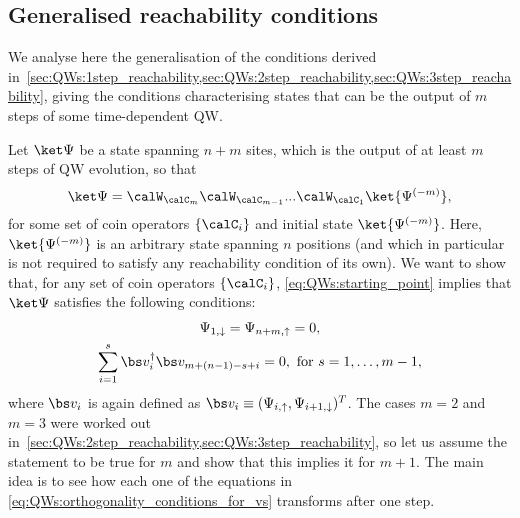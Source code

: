\subsection{Generalised reachability conditions}
\label{sec:QWs:general_reachability_conditions}

We analyse here the generalisation of the conditions derived in~\cref{sec:QWs:1step_reachability,sec:QWs:2step_reachability,sec:QWs:3step_reachability}, giving the conditions characterising states that can be the output of $m$ steps of some time-dependent QW.

Let $\ket\Psi$ be a state spanning $n+m$ sites, which is the output of at least $m$ steps of \ac{QW} evolution, so that
\begin{equation}
	\ket\Psi =
	\calW_{\calC_{m}} \calW_{\calC_{m-1}} ... \calW_{\calC_{1}}
    \ket{\Psi^{(-m)}},
	\label{eq:QWs:starting_point}
\end{equation}
for some set of coin operators $\{\calC_i \}$ and initial state $\ket{\Psi^{(-m)}}$.
Here, $\ket{\Psi^{(-m)}}$ is an arbitrary state spanning $n$ positions (and which in particular is not required to satisfy any reachability condition of its own).
We want to show that, for any set of coin operators $\{\calC_i \}$, \cref{eq:QWs:starting_point} implies that $\ket\Psi$ satisfies the following conditions:
\begin{gather}
	\Psi_{1,\downarrow} = \Psi_{n+m, \uparrow} = 0,
    \label{eq:QWs:vanishing_amplitudes}
	\\
    \sum_{i=1}^s \bs v_i^\dagger \bs v_{m+(n-1)-s+i} = 0,
	\text{ for } s=1,\ldots, m-1,
	\label{eq:QWs:orthogonality_conditions_for_vs}
\end{gather}
where $\bs v_{i}$ is again defined as
$\bs v_i \equiv (\Psi_{i,\uparrow}, \Psi_{i+1, \downarrow})^T$.
The cases $m=2$ and $m=3$ were worked out in~\cref{sec:QWs:2step_reachability,sec:QWs:3step_reachability},
so let us assume the statement to be true for $m$ and show that this implies it for $m+1$.
The main idea is to see how each one of the equations in \cref{eq:QWs:orthogonality_conditions_for_vs} transforms after one step.
